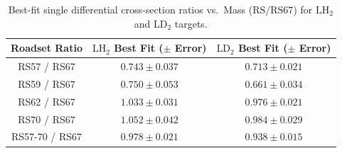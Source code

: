 \begin{table}[htbp]
\centering
\caption{Best-fit single differential cross-section ratios vs.\ Mass ($\text{RS} / \text{RS67}$) for $\text{LH}_2$ and $\text{LD}_2$ targets.}
\label{tab:xsec_ratios_mass_vs_rs67}
\begin{tabular}{|c|c|c|}
\hline
\textbf{Roadset Ratio} & \textbf{$\text{LH}_2$ Best Fit ($\pm$ Error)} & \textbf{$\text{LD}_2$ Best Fit ($\pm$ Error)} \\
\hline
RS57 / RS67 & $0.743 \pm 0.037$ & $0.713 \pm 0.021$ \\
\hline
RS59 / RS67 & $0.750 \pm 0.053$ & $0.661 \pm 0.034$ \\
\hline
RS62 / RS67 & $1.033 \pm 0.031$ & $0.976 \pm 0.021$ \\
\hline
RS70 / RS67 & $1.052 \pm 0.042$ & $0.984 \pm 0.029$ \\
\hline
RS57-70 / RS67 & $0.978 \pm 0.021$ & $0.938 \pm 0.015$ \\
\hline
\end{tabular}
\end{table}
